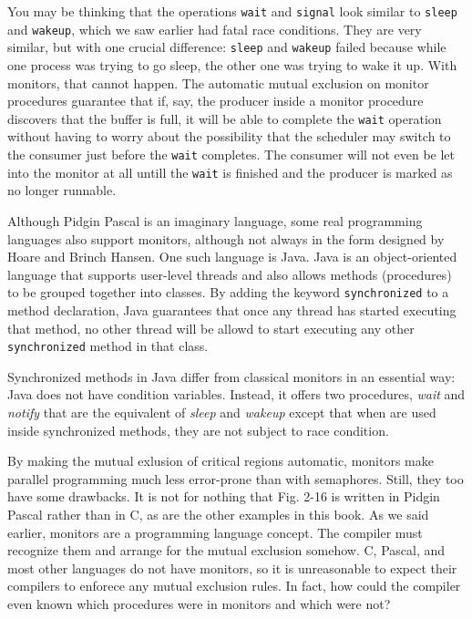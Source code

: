 \documentclass{book}
\newcommand {\sys} [1] {\textsl{#1}}
\newcommand {\cmd} [1] {\texttt{#1}}
\begin{document}
You may be thinking that the operations \cmd{wait} and \cmd{signal} look similar to \cmd{sleep} and \cmd{wakeup},
which we saw earlier had fatal race conditions.
They are very similar, but with one crucial difference:
\cmd{sleep} and \cmd{wakeup} failed because while one process was trying to go sleep, the other one was trying to wake it up.
With monitors, that cannot happen.
The automatic mutual exclusion on monitor procedures guarantee that if, say, 
the producer inside a monitor procedure discovers that the buffer is full, 
it will be able to complete the \cmd{wait} operation without having to worry about the possibility 
that the scheduler may switch to the consumer just before the \cmd{wait} completes.
The consumer will not even be let into the monitor at all untill the \cmd{wait} is finished 
and the producer is marked as no longer runnable.

Although Pidgin Pascal is an imaginary language, some real programming languages also support monitors,
although not always in the form designed by Hoare and Brinch Hansen.
One such language is Java.
Java is an object-oriented language that supports user-level threads and also allows methods (procedures) to be grouped together into classes.
By adding the keyword \cmd{synchronized} to a method declaration,
Java guarantees that once any thread has started executing that method,
no other thread will be allowd to start executing any other \cmd{synchronized} method in that class.

Synchronized methods in Java differ from classical monitors in an essential way:
Java does not have condition variables.
Instead, it offers two procedures, \sys{wait} and \sys{notify} that are the equivalent of \sys{sleep} and \sys{wakeup} except
that when are used inside synchronized methods, they are not subject to race condition.

By making the mutual exlusion of critical regions automatic,
monitors make parallel programming much less error-prone than with semaphores.
Still, they too have some drawbacks.
It is not for nothing that Fig. 2-16 is written in Pidgin Pascal rather than in C,
as are the other examples in this book.
As we said earlier, monitors are a programming language concept.
The compiler must recognize them and arrange for the mutual exclusion somehow.
C, Pascal, and most other languages do not have monitors,
so it is unreasonable to expect their compilers to enforece any mutual exclusion rules.
In fact, how could the compiler even known which procedures were in monitors and which were not?
\end{document}
